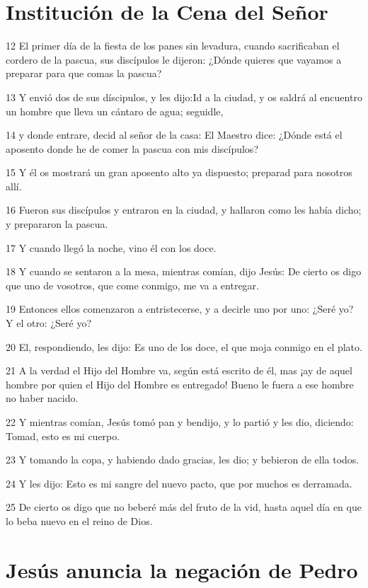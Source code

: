 \section*{Institución de la Cena del Señor}

\par 12 El primer día de la fiesta de los panes sin levadura, cuando sacrificaban el cordero de la pascua, sus discípulos le dijeron: ¿Dónde quieres que vayamos a preparar para que comas la pascua?
\par 13 Y envió dos de sus díscipulos, y les dijo:Id a la ciudad, y os saldrá al encuentro un hombre que lleva un cántaro de agua; seguidle,
\par 14 y donde entrare, decid al señor de la casa: El Maestro dice: ¿Dónde está el aposento donde he de comer la pascua con mis discípulos?
\par 15 Y él os mostrará un gran aposento alto ya dispuesto; preparad para nosotros allí.
\par 16 Fueron sus discípulos y entraron en la ciudad, y hallaron como les había dicho; y prepararon la pascua.
\par 17 Y cuando llegó la noche, vino él con los doce.
\par 18 Y cuando se sentaron a la mesa, mientras comían, dijo Jesús: De cierto os digo que uno de vosotros, que come conmigo, me va a entregar.
\par 19 Entonces ellos comenzaron a entristecerse, y a decirle uno por uno: ¿Seré yo? Y el otro: ¿Seré yo?
\par 20 El, respondiendo, les dijo: Es uno de los doce, el que moja conmigo en el plato.
\par 21 A la verdad el Hijo del Hombre va, según está escrito de él, mas ¡ay de aquel hombre por quien el Hijo del Hombre es entregado! Bueno le fuera a ese hombre no haber nacido.
\par 22 Y mientras comían, Jesús tomó pan y bendijo, y lo partió y les dio, diciendo: Tomad, esto es mi cuerpo.
\par 23 Y tomando la copa, y habiendo dado gracias, les dio; y bebieron de ella todos.
\par 24 Y les dijo: Esto es mi sangre del nuevo pacto, que por muchos es derramada.
\par 25 De cierto os digo que no beberé más del fruto de la vid, hasta aquel día en que lo beba nuevo en el reino de Dios.

\section*{Jesús anuncia la negación de Pedro}

